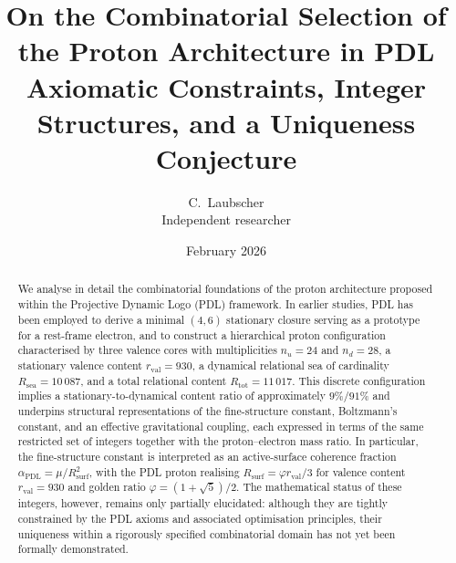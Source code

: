 \documentclass[11pt,a4paper]{article}
\title{On the Combinatorial Selection of the Proton Architecture in PDL\\
Axiomatic Constraints, Integer Structures, and a Uniqueness Conjecture}
\author{C.\ Laubscher\\
{\small Independent researcher}}
\date{February 2026}
\begin{document}
\maketitle

\begin{abstract}
We analyse in detail the combinatorial foundations of the proton architecture proposed within the Projective Dynamic Logo (PDL) framework. In earlier studies, PDL has been employed to derive a minimal $(4,6)$ stationary closure serving as a prototype for a rest-frame electron, and to construct a hierarchical proton configuration characterised by three valence cores with multiplicities $n_u=24$ and $n_d=28$, a stationary valence content $r_{\mathrm{val}}=930$, a dynamical relational sea of cardinality $R_{\mathrm{sea}}=10\,087$, and a total relational content $R_{\mathrm{tot}}=11\,017$.\cite{LaubscherIntroPDL2026,LaubscherPDLFull2026,LaubscherLDP2026,LaubscherIMRadPDL2026} This discrete configuration implies a stationary-to-dynamical content ratio of approximately $9\%/91\%$ and underpins structural representations of the fine-structure constant, Boltzmann’s constant, and an effective gravitational coupling, each expressed in terms of the same restricted set of integers together with the proton–electron mass ratio.\cite{LaubscherIntroPDL2026,LaubscherPDLFull2026,LaubscherLDP2026} In particular, the fine-structure constant is interpreted as an active-surface coherence fraction $\alpha_{\mathrm{PDL}} = \mu / R_{\mathrm{surf}}^{2}$, with the PDL proton realising $R_{\mathrm{surf}} = \varphi r_{\mathrm{val}}/3$ for valence content $r_{\mathrm{val}} = 930$ and golden ratio $\varphi = (1+\sqrt{5})/2$.\cite{LaubscherDerivationAlpha2026} The mathematical status of these integers, however, remains only partially elucidated: although they are tightly constrained by the PDL axioms and associated optimisation principles, their uniqueness within a rigorously specified combinatorial domain has not yet been formally demonstrated.\cite{LaubscherPDLFull2026,LaubscherIMRadPDL2026}


\end{abstract}
\end{document}
